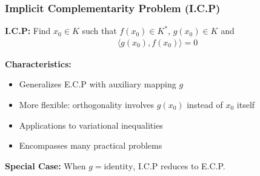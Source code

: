 \documentclass[aspectratio=169,10pt]{beamer}
\begin{document}
\begin{frame}
\frametitle{Implicit Complementarity Problem (I.C.P)}

\begin{definition}
\textbf{I.C.P:} Find $x_0 \in K$ such that $f(x_0) \in K^*$, $g(x_0) \in K$ and
\begin{align*}
\langle g(x_0), f(x_0) \rangle = 0
\end{align*}
\end{definition}

\vspace{0.3cm}

\textbf{Characteristics:}
\begin{itemize}
    \item Generalizes E.C.P with auxiliary mapping $g$
    \item More flexible: orthogonality involves $g(x_0)$ instead of $x_0$ itself
    \item Applications to variational inequalities
    \item Encompasses many practical problems
\end{itemize}

\vspace{0.3cm}

\textbf{Special Case:} When $g = \text{identity}$, I.C.P reduces to E.C.P.

\end{frame}
\end{document}
